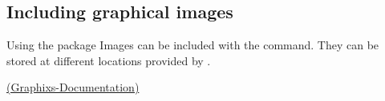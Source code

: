 \subsection{Including graphical images}
\begin{frame}
	\begin{block}{Using the  package}
		Images can be included with the  command.
		They can be stored at different locations provided by .
	\end{block}
	{\tiny \href{../doc/graphicx.pdf}{(Graphixs-Documentation)}}
\end{frame}
\begin{frame}
\end{frame}
\begin{frame}
\end{frame}
\begin{frame}
\end{frame}
